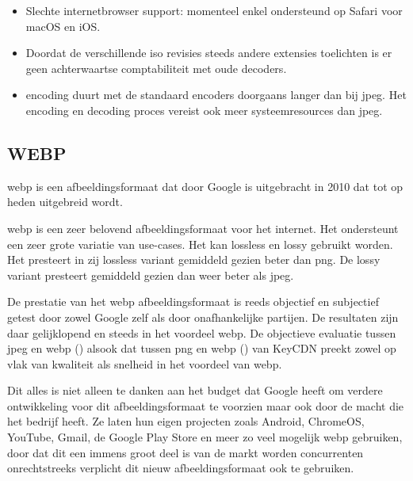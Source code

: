 \begin{itemize}
	\item Slechte internetbrowser support: momenteel enkel ondersteund op Safari voor macOS en iOS. 
	
	\item Doordat de verschillende \gls{iso} revisies steeds andere \glspl{extensie} toelichten is er geen achterwaartse comptabiliteit met oude \glspl{decoder}.
	
	\item \Gls{encoding} duurt met de standaard \glspl{encoder} doorgaans langer dan bij \gls{jpeg}. Het \gls{encoding} en \gls{decoding} proces vereist ook meer systeemresources dan \gls{jpeg}.
\end{itemize}

\subsection{WEBP}
\label{sec:afbeeldingscompressie-webp}

\Gls{webp} is een \gls{afbeeldingsformaat} dat door Google is uitgebracht in 2010 dat tot op heden uitgebreid wordt. 
 
\Gls{webp} is een zeer belovend \gls{afbeeldingsformaat} voor het internet. Het ondersteunt een zeer grote variatie van \glspl{use-case}. Het kan \gls{lossless} en \gls{lossy} gebruikt worden. Het presteert in zij \gls{lossless} variant gemiddeld gezien beter dan \gls{png}. De \gls{lossy} variant presteert gemiddeld gezien dan weer beter als \gls{jpeg}.

De prestatie van het \gls{webp} \gls{afbeeldingsformaat} is reeds objectief en subjectief getest door zowel Google zelf als door onafhankelijke partijen. De resultaten zijn daar gelijklopend en steeds in het voordeel \gls{webp}. De objectieve evaluatie tussen \gls{jpeg} en \gls{webp} (\cite{jpegwebp}) alsook dat tussen \gls{png} en \gls{webp} (\cite{pngwebp}) van KeyCDN preekt zowel op vlak van kwaliteit als snelheid in het voordeel van \gls{webp}.

Dit alles is niet alleen te danken aan het budget dat Google heeft om verdere ontwikkeling voor dit \gls{afbeeldingsformaat} te voorzien maar ook door de macht die het bedrijf heeft. Ze laten hun eigen projecten zoals Android, ChromeOS, YouTube, Gmail, de Google Play Store en meer zo veel mogelijk \gls{webp} gebruiken, door dat dit een immens groot deel is van de markt worden concurrenten onrechtstreeks verplicht dit nieuw \gls{afbeeldingsformaat} ook te gebruiken.

